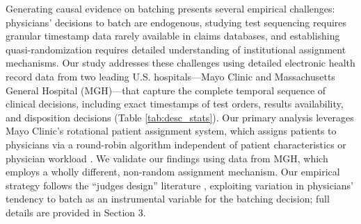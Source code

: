 \documentclass[,,blindrev]{informs}
\begin{document}
Generating causal evidence on batching presents several empirical
challenges: physicians' decisions to batch are endogenous, studying test
sequencing requires granular timestamp data rarely available in claims
databases, and establishing quasi-randomization requires detailed
understanding of institutional assignment mechanisms. Our study
addresses these challenges using detailed electronic health record data
from two leading U.S. hospitals---Mayo Clinic and Massachusetts General
Hospital (MGH)---that capture the complete temporal sequence of clinical
decisions, including exact timestamps of test orders, results
availability, and disposition decisions (Table \ref{tab:desc_stats}).
Our primary analysis leverages Mayo Clinic's rotational patient
assignment system, which assigns patients to physicians via a
round-robin algorithm independent of patient characteristics or
physician workload \citep[\citet{Traub2016}]{traub2016emergency}. We
validate our findings using data from MGH, which employs a wholly
different, non-random assignment mechanism. Our empirical strategy
follows the ``judges design'' literature
\citep[\citet{dobbie2018effects}]{Dahl2014}, exploiting variation in
physicians' tendency to batch as an instrumental variable for the
batching decision; full details are provided in Section 3.
\end{document}
